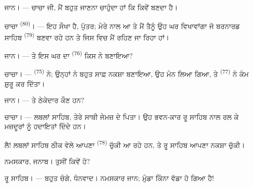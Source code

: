 %
%
%

\VUsaut{6.0mm}
\VUsaut{1.4mm}
\VUsaut{2.2mm}

\VUsaut{3.0mm}

\textsc{ਜਾਨ}। --- ਚਾਚਾ ਜੀ, ਮੈਂ ਬਹੁਤ ਜਾਣਨਾ ਚਾਹੁੰਦਾ ਹਾਂ ਕਿ  ਕਿਵੇਂ ਬਣਦਾ
ਹੈ।

\textsc{ਚਾਚਾ} \textsuperscript{(80)}। --- ਇਹ ਸੌਖਾ ਹੈ, ਪੁੱਤਰ; ਮੇਰੇ ਨਾਲ ਆ ਤੇ ਮੈਂ
ਤੈਨੂੰ ਉਹ ਘਰ ਵਿਖਾਵਾਂਗਾ ਜੋ ਬਰਨਾਰਡ ਸਾਹਿਬ \textsuperscript{(79)} ਬਣਵਾ ਰਹੇ ਹਨ ਤੇ
ਜਿਸ ਵਿਚ ਮੈਂ ਰਹਿਣ ਜਾ ਰਿਹਾ ਹਾਂ।

\textsc{ਜਾਨ}। --- ਤੇ ਇਸ ਘਰ ਦਾ  \textsuperscript{(76)} ਕਿਸ ਨੇ ਬਣਾਇਆ?

\textsc{ਚਾਚਾ}। ---  \textsuperscript{(75)} ਨੇ; ਉਨ੍ਹਾਂ ਨੇ ਬਹੁਤ ਸਾਫ਼
ਨਕਸ਼ਾ ਬਣਾਇਆ, ਉਹ ਮੰਨ ਲਿਆ ਗਿਆ, ਤੇ  \textsuperscript{(77)} ਨੇ ਕੰਮ
ਸ਼ੁਰੂ ਕਰ ਦਿੱਤਾ।

\textsc{ਜਾਨ}। --- ਤੇ ਠੇਕੇਦਾਰ ਕੌਣ ਹਨ?

\textsc{ਚਾਚਾ}। --- ਲਬਲਾਂ ਸਾਹਿਬ, ਤੇਰੇ ਸਾਥੀ ਜੇਮਜ਼ ਦੇ ਪਿਤਾ। ਉਹ ਭਵਨ-ਕਾਰ ਰੂ ਸਾਹਿਬ
ਨਾਲ ਰਲ ਕੇ ਮਜ਼ਦੂਰਾਂ ਨੂੰ ਹਦਾਇਤਾਂ ਦਿੰਦੇ ਹਨ।

ਲੈ! ਲਬਲਾਂ ਸਾਹਿਬ ਠੀਕ ਵੇਲੇ ਆਪਣਾ  \textsuperscript{(78)} ਚੁੱਕੀ ਆ ਰਹੇ
ਹਨ, ਤੇ ਰੂ ਸਾਹਿਬ ਆਪਣਾ ਨਕਸ਼ਾ ਚੁੱਕੀ।

ਨਮਸਕਾਰ, ਜਨਾਬ। ਤੁਸੀਂ ਕਿਵੇਂ ਹੋ?

\textsc{ਰੂ ਸਾਹਿਬ}। --- ਬਹੁਤ ਚੰਗੇ, ਧੰਨਵਾਦ। ਨਮਸਕਾਰ ਜਾਨ; ਮੁੰਡਾ ਕਿੰਨਾ ਵੱਡਾ ਹੋ ਗਿਆ
ਹੈ!

